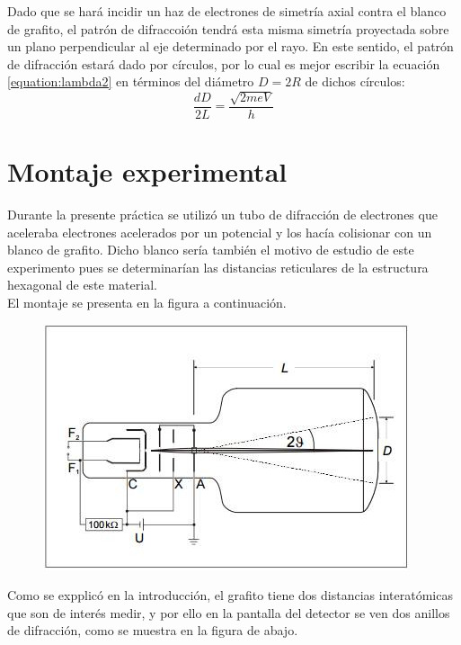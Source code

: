 \documentclass[%
 reprint,
 amsmath,amssymb,
 aps,
]{revtex4-1}
\begin{document}
Dado que se hará incidir un haz de electrones de simetría axial contra el blanco de grafito, el patrón de difraccoión tendrá esta misma simetría proyectada sobre un plano perpendicular al eje determinado por el rayo. En este sentido, el patrón de difracción estará dado por círculos, por lo cual es mejor escribir la ecuación \ref{equation:lambda2} en términos del diámetro $D = 2R$ de dichos círculos:\\

 \begin{equation}
\frac{dD}{2L} = \frac{\sqrt{2meV}}{h}
\label{equation:final}
\end{equation} 


\section{\label{sec:level1}Montaje experimental}
Durante la presente práctica se utilizó un tubo de difracción de electrones que aceleraba electrones acelerados por un potencial y los hacía colisionar con un blanco de grafito. Dicho blanco sería también el motivo de estudio de este experimento pues se determinarían las distancias reticulares de la estructura hexagonal de este material. \\

El montaje se presenta en la figura a continuación. 
\begin{figure}
\centering
\includegraphics[width=0.7\linewidth]{montaje}
\caption[Vista esquemática del montaje experimental]{}
\label{fig:montaje}
\end{figure}

Como se expplicó en la introducción, el grafito tiene dos distancias interatómicas que son de interés medir, y por ello en la pantalla del detector se ven dos anillos de difracción, como se muestra en la figura de abajo.\\
\end{document}
